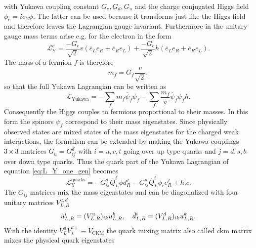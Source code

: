 with Yukawa coupling constant $G_e,G_d,G_u$ and the charge conjugated Higgs field $\phi_c=i\sigma_2\phi$. The latter can be used because it transforms just like the Higgs field and therefore leaves the Lagrangian gauge invariant. Furthermore in the unitary gauge mass terms arise  e.g. for the electron in the form
\begin{equation}
    \mathcal{L}_\mathrm{Y}^e=\frac{-G_e}{\sqrt{2}} v (\overline{e}_L e_R+\overline{e}_R e_L)+\frac{-G_e}{\sqrt{2}} h (\overline{e}_L e_R+\overline{e}_R e_L).
\end{equation}
The mass of a fermion $f$ is therefore
\begin{equation}
    m_f=G_f\frac{v}{\sqrt{2}},
\end{equation}
so that the full Yukawa Lagrangian can be written as
\begin{equation}
    \mathcal{L}_\mathrm{Yukawa}=-\sum_f m_f\overline{\psi}_f \psi_f -\sum_f \frac{m_f}{v}\overline{\psi}_f \psi_f h.
    \label{eq:yukawa_term}
\end{equation}
Consequently the Higgs couples to fermions proportional to their masses. In this form the spinors $\psi_f$ correspond to their mass eigenstates. Since physically observed states are mixed states of the mass eigenstates for the charged weak interactions, the formalism can be extended by making the Yukawa couplings $3\times 3$ matrices $G_u=G_{ij}^d$ with $i=u,c,t$ going over up type quarks and $j=d,s,b$ over down type quarks. Thus the quark part of the Yukawa Lagrangian of equation \ref{eq:L_Y_one_gen} becomes
\begin{equation}
    \mathcal{L}_\mathrm{Y}^{\text{quarks}} =
    -G_{ij}^d \overline{Q}_L^i \phi d_R^j -G_{ij}^u \overline{Q}_L^i \phi_c e_R^j + h.c.
\end{equation}
The $G_{ij}$ matrices mix the mass eigenstates and can be diagonalized with four unitary matrices $V_{L,R}^{u,d}$
\begin{equation}
    \Tilde{u}^i_{L,R}=(V^u_{L,R})_{ik}u^k_{L,R}, \quad \Tilde{d}^i_{L,R}=(V^d_{L,R})_{ik}u^k_{L,R}.
\end{equation}
With the identity $V_L^uV_L^{d\dagger}\equiv V_\mathrm{CKM}$ the quark mixing matrix also called \ac{ckm} matrix mixes the physical quark eigenstates
